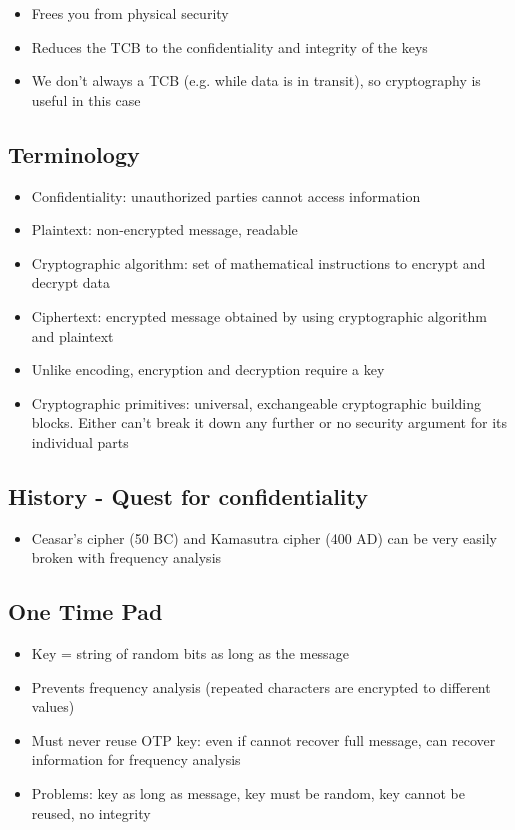 \documentclass{article}
\newenvironment{myitemize}
{ \begin{itemize}
    \setlength{\itemsep}{005pt}
    \setlength{\parskip}{0pt}
    \setlength{\parsep}{0pt}     }
{ \end{itemize}                  }
\begin{document}
\begin{multicols}{2}
\begin{myitemize}
    \item Frees you from physical security
    \item Reduces the TCB to the confidentiality and integrity of the keys
    \item We don't always a TCB (e.g. while data is in transit), so cryptography is useful in this case
\end{myitemize}

\subsection{Terminology}

\begin{myitemize}
    \item Confidentiality: unauthorized parties cannot access information
    \item Plaintext: non-encrypted message, readable
    \item Cryptographic algorithm: set of mathematical instructions to encrypt and decrypt data
    \item Ciphertext: encrypted message obtained by using cryptographic algorithm and plaintext
    \item Unlike encoding, encryption and decryption require a key
    \item Cryptographic primitives: universal, exchangeable cryptographic building blocks. Either can't break it down any further or no security argument for its individual parts
\end{myitemize}

\subsection{History - Quest for confidentiality}

\begin{myitemize}
    \item Ceasar's cipher (50 BC) and Kamasutra cipher (400 AD) can be very easily broken with frequency analysis
\end{myitemize}

\subsection{One Time Pad}

\begin{myitemize}
    \item Key = string of random bits as long as the message 
    \item Prevents frequency analysis (repeated characters are encrypted to different values)
    \item Must never reuse OTP key: even if cannot recover full message, can recover information for frequency analysis 
    \item Problems: key as long as message, key must be random, key cannot be reused, no integrity
\end{myitemize}


\end{multicols}
\end{document}
